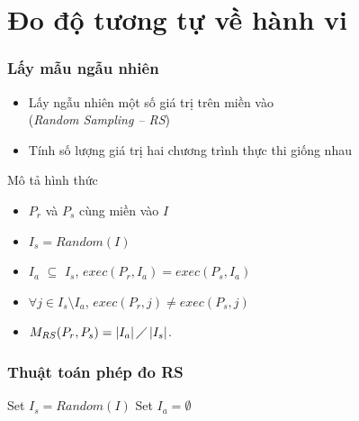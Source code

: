 \documentclass{beamer}
\begin{document}
\section{Đo độ tương tự về hành vi}
\begin{frame}
  \frametitle{Lấy mẫu ngẫu nhiên}
  \begin{itemize}  	
  	\item Lấy ngẫu nhiên một số giá trị trên miền vào \\(\emph{Random
  		Sampling -- RS})
  	\item Tính số lượng giá trị hai chương trình
  	thực thi giống nhau
  \end{itemize}
  	\begin{block}{Mô tả hình thức}
	\begin{itemize}
		\item $P_r$ và $P_s$ cùng miền vào $I$
		\item $I_{s} = Random(I)$
		\item $I_{a}$ $\subseteq $	$I_{s}$, $exec(P_r, I_a) = exec(P_s, I_a)$
		\item $\forall j \in I_{s} \setminus I_{a}$, $exec(P_r, j) \neq exec(P_s, j)$
		\item $M_{RS}(P_r, P_s) = \left|I_{a}\right| \diagup
		\left|I_{s}\right| $.
	\end{itemize}
	
	\end{block}

\end{frame}


\begin{frame}
  \frametitle{Thuật toán phép đo RS}
  \begin{algorithm}[H]
	Set $I_s = Random(I)$ \;
	Set $I_a = \emptyset$\;
  	{  			
  	}
  \end{algorithm}
\end{frame}
\end{document}

